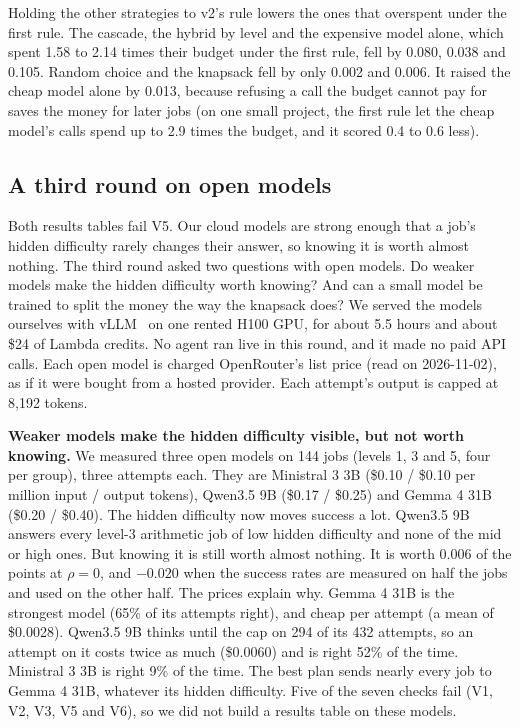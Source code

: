 Holding the other strategies to v2's rule lowers the ones that overspent under the first rule. The cascade, the hybrid
by level and the expensive model alone, which spent 1.58 to 2.14 times their budget under the first rule, fell by
0.080, 0.038 and 0.105. Random choice and the knapsack fell by only 0.002 and 0.006. It raised the cheap model alone by
0.013, because refusing a call the budget cannot pay for saves the money for later jobs (on one small project, the first
rule let the cheap model's calls spend up to 2.9 times the budget, and it scored 0.4 to 0.6 less).

\subsection{A third round on open models}
\label{sec:open}
Both results tables fail V5. Our cloud models are strong enough that a job's hidden difficulty rarely changes their
answer, so knowing it is worth almost nothing. The third round asked two questions with open models. Do weaker models
make the hidden difficulty worth knowing? And can a small model be trained to split the money the way the knapsack
does? We served the models ourselves with vLLM~\cite{kwon2023vllm} on one rented H100 GPU, for about 5.5 hours and
about \$24 of Lambda credits. No agent ran live in this round, and it made no paid API calls. Each open model is charged
OpenRouter's list price (read on 2026-11-02), as if it were bought from a hosted provider. Each attempt's output is
capped at 8,192 tokens.

\textbf{Weaker models make the hidden difficulty visible, but not worth knowing.} We measured three open models on 144
jobs (levels 1, 3 and 5, four per group), three attempts each. They are Ministral 3 3B (\$0.10 / \$0.10 per million
input / output tokens), Qwen3.5 9B (\$0.17 / \$0.25) and Gemma 4 31B (\$0.20 / \$0.40). The hidden difficulty now
moves success a lot. Qwen3.5 9B answers every level-3 arithmetic job of low hidden difficulty and none of the mid or
high ones. But knowing it is still worth almost nothing. It is worth 0.006 of the points at $\rho = 0$, and $-0.020$
when the success rates are measured on half the jobs and used on the other half. The prices explain why. Gemma 4 31B
is the strongest model (65\% of its attempts right), and cheap per attempt (a mean of \$0.0028). Qwen3.5 9B thinks
until the cap on 294 of its 432 attempts, so an attempt on it costs twice as much (\$0.0060) and is right 52\% of the
time. Ministral 3 3B is right 9\% of the time. The best plan sends nearly every job to Gemma 4 31B, whatever its hidden
difficulty. Five of the seven checks fail (V1, V2, V3, V5 and V6), so we did not build a results table on these models.

